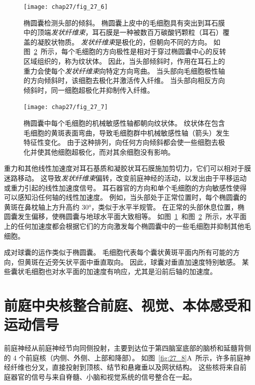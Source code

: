 \begin{figure}[htbp]
	\centering
	\texttt{[image: chap27/fig\_27\_6]}
	\caption{椭圆囊检测头部的倾斜。
		椭圆囊上皮中的毛细胞具有突出到耳石膜中的顶端\textit{发状纤维束}，耳石膜是一种被数百万碳酸钙颗粒（耳石）覆盖的凝胶状物质。
		\textit{发状纤维束}是极化的，但朝向不同的方向。
		如图~\ref{fig:27_7}~所示，每个毛细胞的方向极性是相对于穿过椭圆囊中心的反转区域组织的，称为纹状体。
		因此，当头部倾斜时，作用在耳石上的重力会使每个\textit{发状纤维束}向特定方向弯曲。
		当头部向毛细胞极性轴的方向倾斜时，该细胞去极化并激活传入纤维。
		当头部向相反方向倾斜时，同一细胞超极化并抑制传入纤维\cite{iurato2013submicroscopic}。}
	\label{fig:27_6}
\end{figure}


\begin{figure}[htbp]
	\centering
	\texttt{[image: chap27/fig\_27\_7]}
	\caption{椭圆囊中每个毛细胞的机械敏感性轴都朝向纹状体。
		纹状体在包含毛细胞的黄斑表面弯曲，导致毛细胞群中机械敏感性轴（箭头）发生特征性变化。
		由于这种排列，向任何方向倾斜都会使一些细胞去极化并使其他细胞超极化，而对其余细胞没有影响\cite{spoendlin2016ultrastructure}。}
	\label{fig:27_7}
\end{figure}


重力和其他线性加速度对耳石基质和凝胶状耳石膜施加剪切力，它们可以相对于膜迷路移动。
这导致\textit{发状纤维束}偏转，改变前庭神经的活动，以发出由于平移运动或重力引起的线性加速度信号。
耳石器官的方向和单个毛细胞的方向敏感性使得可以感知沿任何轴的线性加速度。
例如，当头部处于正常位置时，每个椭圆囊的黄斑在鼻枕轴上方升高约 30°，类似于水平半规管。
在正常的头部休息位置，椭圆囊发生偏移，使椭圆囊与地球水平面大致相等。
如图~\ref{fig:27_6}~和图~\ref{fig:27_7}~所示，水平面上的任何加速度都会根据它们的方向激发每个椭圆囊中的一些毛细胞并抑制其他毛细胞。


成对球囊的运作类似于椭圆囊。
毛细胞代表每个囊状黄斑平面内所有可能的方向，但黄斑在近旁矢状平面中垂直取向。
因此，球囊对垂直加速度特别敏感。
某些囊状毛细胞也对水平面的加速度有响应，尤其是沿前后轴的加速度。



\section{前庭中央核整合前庭、视觉、本体感受和运动信号}

前庭神经从前庭神经节向同侧投射，主要到达位于第四脑室底部的脑桥和延髓背侧的 4 个前庭核（内侧、外侧、上部和降部）。
如图~\ref{fig:27_8}A~所示，许多前庭神经纤维也分叉，直接投射到顶核、结节和悬雍垂以及网状结构。
这些核将来自前庭器官的信号与来自脊髓、小脑和视觉系统的信号整合在一起。


